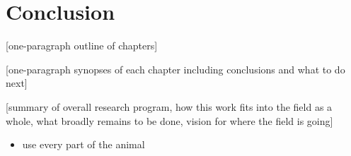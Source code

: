 \chapter*{Conclusion}

[one-paragraph outline of chapters]

[one-paragraph synopses of each chapter including conclusions and what to do next]

[summary of overall research program, how this work fits into the field as a whole, what broadly remains to be done, vision for where the field is going]

\begin{itemize}
	\item use every part of the animal
\end{itemize}








